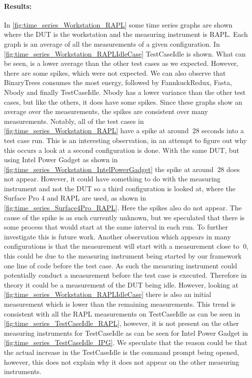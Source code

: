 \paragraph{Results:}
In \cref{fig:time_series_Workstation_RAPL} some time series graphs are shown where the DUT is the workstation and the measuring instrument is RAPL. Each graph is an average of all the measurements of a given configuration. In \cref{fig:time_series_Workstation_RAPLIdleCase} TestCaseIdle is shown. What can be seen, is a lower average than the other test cases as we expected. However, there are some spikes, which were not expected. We can also observe that BinaryTrees consumes the most energy, followed by FannkuckRedux, Fasta, Nbody and finally TestCaseIdle. Nbody has a lower variance than the other test cases, but like the others, it does have some spikes. Since these graphs show an average over the measurements, the spikes are consistent over many measurements. Notably, all of the test cases in \cref{fig:time_series_Workstation_RAPL} have a spike at around $~28$ seconds into a test case run. This is an interesting observation, in an attempt to figure out why this occurs a look at a second configuration is done. With the same DUT, but using Intel Power Gadget as shown in \cref{fig:time_series_Workstation_IntelPowerGadget} the spike at around $~28$ does not appear. However, it could have something to do with the measuring instrument and not the DUT so a third configuration is looked at, where the Surface Pro 4 and RAPL are used, as shown in \cref{fig:time_series_Surface4Pro_RAPL}. Here the spikes also do not appear. The cause of the spike is as such currently unknown, but we speculated that there is some process that would start at the same interval in each run. To further investigate this is future work. Another observation which appears in many configurations is that the measurement will start with a measurement close to $~0$, this could be due to the measuring instrument being started by our framework one line of code before the test case. As such the measuring instrument could potentially conduct a measurement before the test case is executed. Therefore in theory it could be a measurement of the DUT being idle. However, looking at \cref{fig:time_series_Workstation_RAPLIdleCase} there is also an initial measurement which is lower than the remaining measurements. This trend is consistent with all the RAPL measurements on TestCaseIdle as can be seen in \cref{fig:time_series_TestCaseIdle_RAPL}, however, it is not present on the other measuring instruments for TestCaseIdle as can be seen for Intel Power Gadget in \cref{fig:time_series_TestCaseIdle_IPG}. We speculate that the reason could be that the actual increase in the TestCaseIdle is the command prompt being opened, however, this does not explain why it does not appear on the other measuring instruments. 


